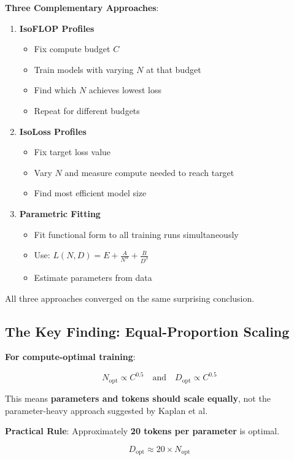 \documentclass{article}
\begin{document}
\textbf{Three Complementary Approaches}:

\begin{enumerate}
\item \textbf{IsoFLOP Profiles}
\begin{itemize}
\item Fix compute budget $C$
\item Train models with varying $N$ at that budget
\item Find which $N$ achieves lowest loss
\item Repeat for different budgets
\end{itemize}

\item \textbf{IsoLoss Profiles}
\begin{itemize}
\item Fix target loss value
\item Vary $N$ and measure compute needed to reach target
\item Find most efficient model size
\end{itemize}

\item \textbf{Parametric Fitting}
\begin{itemize}
\item Fit functional form to all training runs simultaneously
\item Use: $L(N, D) = E + \frac{A}{N^\alpha} + \frac{B}{D^\beta}$
\item Estimate parameters from data
\end{itemize}
\end{enumerate}

All three approaches converged on the same surprising conclusion.

\subsection{The Key Finding: Equal-Proportion Scaling}

\begin{tcolorbox}[colback=blue!5!white, colframe=blue!50!black, title=Chinchilla's Central Insight]
\textbf{For compute-optimal training}:

\[
N_{\text{opt}} \propto C^{0.5} \quad \text{and} \quad D_{\text{opt}} \propto C^{0.5}
\]

This means \textbf{parameters and tokens should scale equally}, not the parameter-heavy approach suggested by Kaplan et al.

\textbf{Practical Rule}: Approximately \textbf{20 tokens per parameter} is optimal.

\[
D_{\text{opt}} \approx 20 \times N_{\text{opt}}
\]
\end{tcolorbox}
\end{document}
